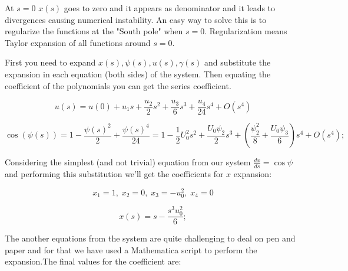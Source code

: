 \documentclass[12pt]{article}
\begin{document}
At $s=0$ $x(s)$ goes to zero and it appears as denominator and it leads to divergences causing numerical instability. An easy way to solve this is to regularize the functions at the "South pole" when $s=0$. Regularization means Taylor expansion of all functions around $s=0$.


First you need to expand $x(s),\psi(s),u(s),\gamma(s)$ and substitute the expansion in each equation (both sides) of the system. Then equating the coefficient of the polynomials you can get the series coefficient.

$$
u(s)=u(0) + u_1s + \frac{u_2 }{2}s^2 + \frac{u_3 }{6}s^3 + \frac{u_4 }{24}s^4 + O(s^4)
$$


$$
\cos(\psi(s))= 1 - \frac{\psi(s)^2}{2} + \frac{\psi(s)^4}{24} = 1 - \frac{1}{2} U_0^2 s^2 + \frac{U_0 \psi_2}{2} s^3 + (\frac{\psi_2^2}{8} + \frac{U_0 \psi_3}{6}) s^4 +O(s^4);
$$













Considering the simplest (and not trivial) equation from our system $\frac{dx}{ds} =  \cos \psi$ and performing this substitution we'll get the coefficients for $x$ expansion:

$$
x_1 = 1 ,\; x_2 = 0 ,\; x_3 = - u_0^2 ,\; x_4 = 0
$$

$$
x(s)=s-\frac{s^3 u_0^2}{6};
$$

The another equations from the system are quite challenging to deal on pen and paper and for that we have used a Mathematica script to perform the expansion.The final values for the coefficient are:
\end{document}

